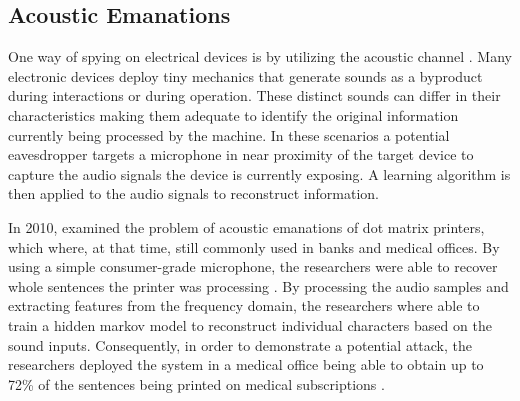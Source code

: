 


\subsection{Acoustic Emanations}
One way of spying on electrical devices is by utilizing the acoustic channel \cite{Backes:2010:ASA:1929820.1929847,1301311,Zhuang:2009:KAE:1609956.1609959}. Many electronic devices deploy tiny mechanics that generate sounds as a byproduct during interactions or during operation. These distinct sounds can differ in their characteristics making them adequate to identify the original information currently being processed by the machine. In these scenarios a potential eavesdropper targets a microphone in near proximity of the target device to capture the audio signals the device is currently exposing. A learning algorithm is then applied to the audio signals to reconstruct information.

In 2010, \citeauthor{Backes:2010:ASA:1929820.1929847} examined the problem of acoustic emanations of dot matrix printers, which where, at that time, still commonly used in banks and medical offices. By using a simple consumer-grade microphone, the researchers were able to recover whole sentences the printer was processing \cite{Backes:2010:ASA:1929820.1929847}. By processing the audio samples and extracting features from the frequency domain, the researchers where able to train a hidden markov model to reconstruct individual characters based on the sound inputs. Consequently, in order to demonstrate a potential attack, the researchers deployed the system in a medical office being able to obtain up to 72\% of the sentences being printed on medical subscriptions \cite{Backes:2010:ASA:1929820.1929847}.

